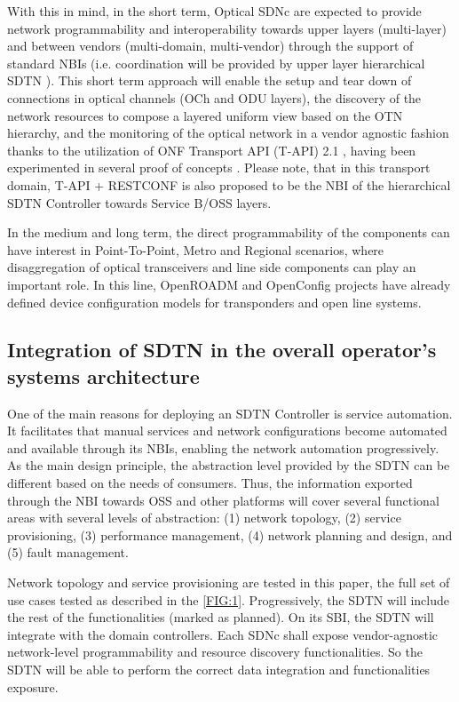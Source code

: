 \documentclass[10pt, conference]{IEEEtran}
\begin{document}
With this in mind, in the short term, Optical SDNc are expected to provide network programmability and interoperability towards upper layers (multi-layer) and between vendors (multi-domain, multi-vendor) through the support of standard NBIs (i.e. coordination will be provided by upper layer hierarchical SDTN ). This short term approach will enable the setup and tear down of connections in optical channels (OCh and ODU layers), the discovery of the network resources to compose a layered uniform view based on the OTN hierarchy, and the monitoring of the optical network in a vendor agnostic fashion thanks to the utilization of ONF Transport API (T-API) 2.1 \cite{lopez2016transport}, having been experimented in several proof of concepts \cite{mayoral2016first}. Please note, that in this transport domain, T-API + RESTCONF is also proposed to be the NBI of the hierarchical SDTN Controller towards Service B/OSS layers.

In the medium and long term, the direct programmability of the components can have interest in Point-To-Point, Metro and Regional scenarios, where disaggregation of optical transceivers and line side components can play an important role. In this line, OpenROADM \cite{oda2016learning} and OpenConfig projects have already defined device configuration models for transponders and open line systems. 

\subsection{Integration of SDTN  in the overall operator’s systems architecture}
\label{section:sdtn}
One of the main reasons for deploying an SDTN Controller is service automation. It facilitates that manual services and network configurations become automated and available through its NBIs, enabling the network automation progressively. As the main design principle, the abstraction level provided by the SDTN  can be different based on the needs of consumers. Thus, the information exported through the NBI towards OSS and other platforms will cover several functional areas with several levels of abstraction: (1) network topology, (2) service provisioning, (3) performance management, (4) network planning and design, and (5) fault management. 

Network topology and service provisioning are tested in this paper, the full set of use cases tested as described in the \cref{FIG:1}. Progressively, the SDTN  will include the rest of the functionalities (marked as planned). On its SBI, the SDTN  will integrate with the domain controllers. Each SDNc shall expose vendor-agnostic network-level programmability and resource discovery functionalities. So the SDTN  will be able to perform the correct data integration and functionalities exposure.
\end{document}
